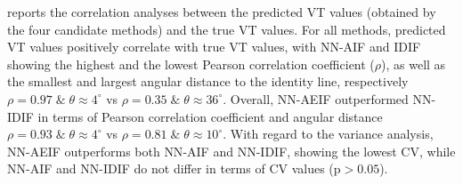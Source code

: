         
        reports the correlation analyses between the predicted \gls{VT} values (obtained by the four candidate methods) and the true \gls{VT} values. For all methods, predicted \gls{VT} values positively correlate with true \gls{VT} values, with \gls{NN}-\gls{AIF} and \gls{IDIF} showing the highest and the lowest Pearson correlation coefficient ($\rho$), as well as the smallest and largest angular distance to the identity line, respectively $\rho = 0.97 \; \& \;  \theta \approx 4^{\circ}$ vs $\rho = 0.35 \; \&  \; \theta \approx 36^{\circ}$. Overall, \gls{NN}-\gls{AE}\gls{IF} outperformed \gls{NN}-\gls{IDIF} in terms of Pearson correlation coefficient and angular distance $\rho = 0.93 \; \& \; \theta  \approx 4^{\circ}$ vs $\rho = 0.81 \; \&  \; \theta \approx 10^{\circ}$. With regard to the variance analysis, \gls{NN}-\gls{AE}\gls{IF} outperforms both \gls{NN}-\gls{AIF} and \gls{NN}-\gls{IDIF}, showing the lowest \gls{CV}, while \gls{NN}-\gls{AIF} and \gls{NN}-\gls{IDIF} do not differ in terms of \gls{CV} values (p$>0.05$).
    
